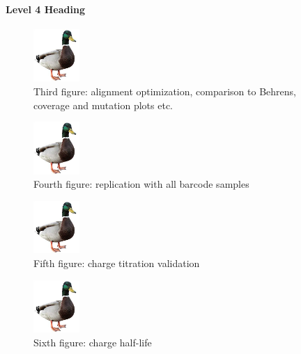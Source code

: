 \documentclass[9pt,lineno]{elife}
\begin{document}
\paragraph{Level 4 Heading}
\lipsum[7]














\begin{figure}[ht!]
\centering
\includegraphics[height=2cm]{figures/duck.jpg}
\caption{
Third figure: alignment optimization, comparison to Behrens, coverage and mutation plots etc.
}
\label{fig:fig3}
\end{figure}





\begin{figure}[ht!]
\centering
\includegraphics[height=2cm]{figures/duck.jpg}
\caption{
Fourth figure: replication with all barcode samples
}
\label{fig:fig4}
\end{figure}


\begin{figure}[ht!]
\centering
\includegraphics[height=2cm]{figures/duck.jpg}
\caption{
Fifth figure: charge titration validation
}
\label{fig:fig5}
\end{figure}


\begin{figure}[ht!]
\centering
\includegraphics[height=2cm]{figures/duck.jpg}
\caption{
Sixth figure: charge half-life
}
\label{fig:fig6}
\end{figure}
\end{document}
